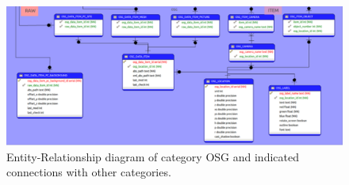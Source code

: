 \begin{figure}[H]
\centering
\includegraphics[scale=0.35]{fig/database/ERDB_OSG_conn.pdf}
\caption{Entity-Relationship diagram of category OSG and indicated connections with other categories.}
\label{fig:db_erdb_osg}
\end{figure}


